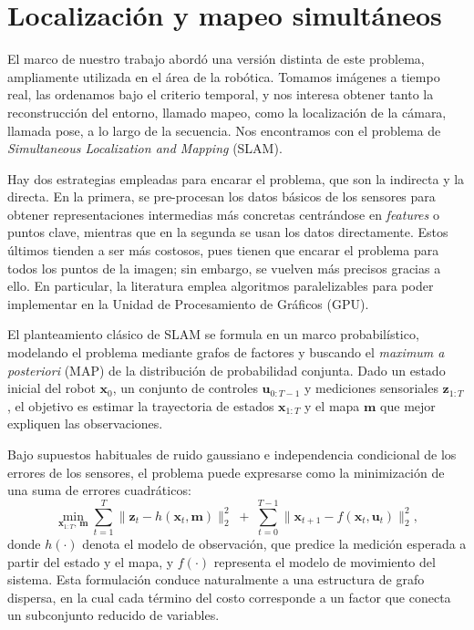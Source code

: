 \section{Localización y mapeo simultáneos}

El marco de nuestro trabajo abordó una versión distinta de este problema, ampliamente utilizada en el área de la robótica. Tomamos imágenes a tiempo real, las ordenamos bajo el criterio temporal, y nos interesa obtener tanto la reconstrucción del entorno, llamado mapeo, como la localización de la cámara, llamada pose, a lo largo de la secuencia. Nos encontramos con el problema de \textit{Simultaneous Localization and Mapping} (SLAM).

Hay dos estrategias empleadas para encarar el problema, que son la indirecta y la directa. En la primera, se pre-procesan los datos básicos de los sensores para obtener representaciones intermedias más concretas centrándose en \textit{features} o puntos clave, mientras que en la segunda se usan los datos directamente. Estos últimos tienden a ser más costosos, pues tienen que encarar el problema para todos los puntos de la imagen; sin embargo, se vuelven más precisos gracias a ello. En particular, la literatura emplea algoritmos paralelizables para poder implementar en la Unidad de Procesamiento de Gráficos (GPU).

El planteamiento clásico de SLAM se formula en un marco probabilístico, modelando el problema mediante grafos de factores y buscando el \emph{maximum a posteriori} (MAP) de la distribución de probabilidad conjunta. Dado un estado inicial del robot $\mathbf{x}_0$, un conjunto de controles $\mathbf{u}_{0:T-1}$ y mediciones sensoriales $\mathbf{z}_{1:T}$, el objetivo es estimar la trayectoria de estados $\mathbf{x}_{1:T}$ y el mapa $\mathbf{m}$ que mejor expliquen las observaciones.

Bajo supuestos habituales de ruido gaussiano e independencia condicional de los errores de los sensores, el problema puede expresarse como la minimización de una suma de errores cuadráticos:
\begin{equation}
\min_{\mathbf{x}_{1:T},\,\mathbf{m}}
\sum_{t=1}^{T}
\big\|
\mathbf{z}_t - h(\mathbf{x}_t, \mathbf{m})
\big\|_2^2
\;+\;
\sum_{t=0}^{T-1}
\big\|
\mathbf{x}_{t+1} - f(\mathbf{x}_t, \mathbf{u}_t)
\big\|_2^2,
\end{equation}
donde $h(\cdot)$ denota el modelo de observación, que predice la medición esperada a partir del estado y el mapa, y $f(\cdot)$ representa el modelo de movimiento del sistema. Esta formulación conduce naturalmente a una estructura de grafo dispersa, en la cual cada término del costo corresponde a un factor que conecta un subconjunto reducido de variables.

